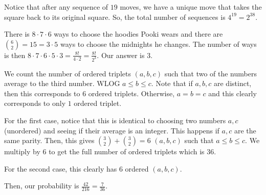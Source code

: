 \documentclass[11pt]{article}
\begin{document}
\begin{sol} 
Notice that after any sequence of $19$ moves, we have a unique move that takes the square back to its original square. So, the total number of sequences is $4^{19}=\boxed{2^{38}}$.
\end{sol}


\begin{sol} 
There is $8\cdot 7\cdot 6$ ways to choose the hoodies Pooki wears and there are $\binom{6}{2}=15=3\cdot 5$ ways to choose the midnights he changes. The number of ways is then $8\cdot 7\cdot 6\cdot 5\cdot 3 = \frac{8!}{4\cdot 2}=\frac{8!}{2^{3}}$. Our answer is $\boxed{3}$.
\end{sol}


\begin{sol} 
We count the number of ordered triplets $(a,b,c)$ such that two of the numbers average to the third number. WLOG $a\leq b\leq c$. Note that if $a,b,c$ are distinct, then this corresponds to $6$ ordered triplets. Otherwise, $a=b=c$ and this clearly corresponds to only $1$ ordered triplet.

For the first case, notice that this is identical to choosing two numbers $a,c$ (unordered) and seeing if their average is an integer. This happens if $a,c$ are the same parity. Then, this gives $\binom{3}{2} + \binom{3}{2}=6$ $(a,b,c)$ such that $a\leq b\leq c$. We multiply by $6$ to get the full number of ordered triplets which is $36$.

For the second case, this clearly has $6$ ordered $(a,b,c)$.

Then, our probability is $\frac{42}{216}=\boxed{\frac{7}{36}}$.
\end{sol}

\end{document}
